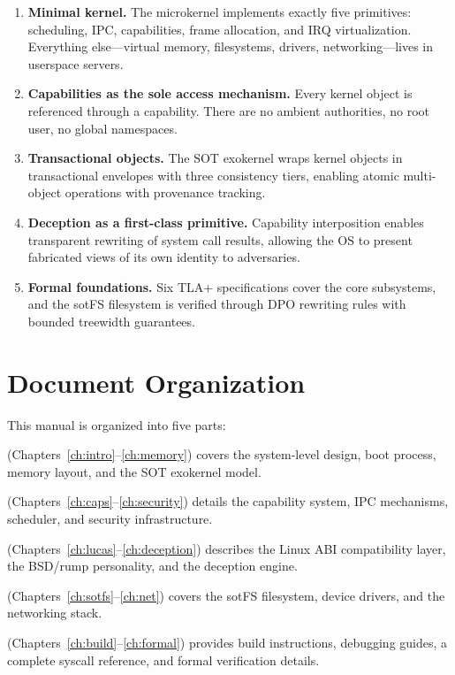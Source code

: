 \documentclass[11pt,a4paper,twoside]{report}
\theoremstyle{definition}
\begin{document}
\begin{enumerate}[leftmargin=1.4em]
  \item \textbf{Minimal kernel.} The microkernel implements exactly five
        primitives: scheduling, IPC, capabilities, frame allocation, and IRQ
        virtualization. Everything else---virtual memory, filesystems, drivers,
        networking---lives in userspace servers.
  \item \textbf{Capabilities as the sole access mechanism.} Every kernel object
        is referenced through a capability. There are no ambient authorities,
        no root user, no global namespaces.
  \item \textbf{Transactional objects.} The SOT exokernel wraps kernel objects
        in transactional envelopes with three consistency tiers, enabling
        atomic multi-object operations with provenance tracking.
  \item \textbf{Deception as a first-class primitive.} Capability interposition
        enables transparent rewriting of system call results, allowing the OS
        to present fabricated views of its own identity to adversaries.
  \item \textbf{Formal foundations.} Six TLA+ specifications cover the core
        subsystems, and the sotFS filesystem is verified through DPO rewriting
        rules with bounded treewidth guarantees.
\end{enumerate}

\section{Document Organization}

This manual is organized into five parts:

\begin{description}[leftmargin=1.4em]
  \item[Part~I: Architecture] (Chapters~\ref{ch:intro}--\ref{ch:memory})
    covers the system-level design, boot process, memory layout, and the
    SOT exokernel model.
  \item[Part~II: Subsystems] (Chapters~\ref{ch:caps}--\ref{ch:security})
    details the capability system, IPC mechanisms, scheduler, and security
    infrastructure.
  \item[Part~III: Personalities] (Chapters~\ref{ch:lucas}--\ref{ch:deception})
    describes the Linux ABI compatibility layer, the BSD/rump personality,
    and the deception engine.
  \item[Part~IV: Services \& Drivers] (Chapters~\ref{ch:sotfs}--\ref{ch:net})
    covers the sotFS filesystem, device drivers, and the networking stack.
  \item[Part~V: Operations] (Chapters~\ref{ch:build}--\ref{ch:formal})
    provides build instructions, debugging guides, a complete syscall
    reference, and formal verification details.
\end{description}
\end{document}
